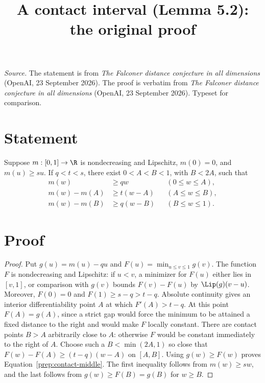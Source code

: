 \documentclass[11pt,reqno]{amsart}
\title{A contact interval (Lemma 5.2): the original proof}
\begin{document}
\maketitle
\noindent\emph{Source.} The statement is from \emph{The Falconer distance conjecture in all dimensions} (OpenAI, 23 September 2026). The proof is verbatim from \emph{The Falconer distance conjecture in all dimensions} (OpenAI, 23 September 2026). Typeset for comparison.

\section*{Statement}
\begin{lemma}\label{prep:contact}
Suppose $m:[0,1]\to\R$ is nondecreasing and Lipschitz,
$m(0)=0$, and $m(u)\ge su$. If $q<t<s$, there exist
$0<A<B<1$, with $B<2A$, such that
\begin{align}
 m(w)&\ge qw &&(0\le w\le A),\label{prep:contact-first}\\
 m(w)-m(A)&\ge t(w-A)&&(A\le w\le B),\label{prep:contact-middle}\\
 m(w)-m(B)&\ge q(w-B)&&(B\le w\le1).\label{prep:contact-last}
\end{align}
\end{lemma}

\section*{Proof}
\begin{proof}
Put $g(u)=m(u)-qu$ and $F(u)=\min_{u\le v\le1}g(v)$.
The function $F$ is nondecreasing and Lipschitz: if $u<v$, a minimizer
for $F(u)$ either lies in $[v,1]$, or comparison with $g(v)$ bounds
$F(v)-F(u)$ by $\Lip(g)(v-u)$. Moreover, $F(0)=0$ and
$F(1)\ge s-q>t-q$. Absolute continuity gives an interior
differentiability point $A$ at which $F'(A)>t-q$.
At this point $F(A)=g(A)$, since a strict gap would force the minimum
to be attained a fixed distance to the right and would make $F$ locally
constant. There are contact points $B>A$ arbitrarily close to $A$:
otherwise $F$ would be constant immediately to the right of $A$.
Choose such a $B<\min(2A,1)$ so close that
$F(w)-F(A)\ge(t-q)(w-A)$ on $[A,B]$.
Using $g(w)\ge F(w)$ proves Equation~\eqref{prep:contact-middle}.
The first inequality follows from $m(w)\ge sw$, and the last follows
from $g(w)\ge F(B)=g(B)$ for $w\ge B$.
\end{proof}
\end{document}
